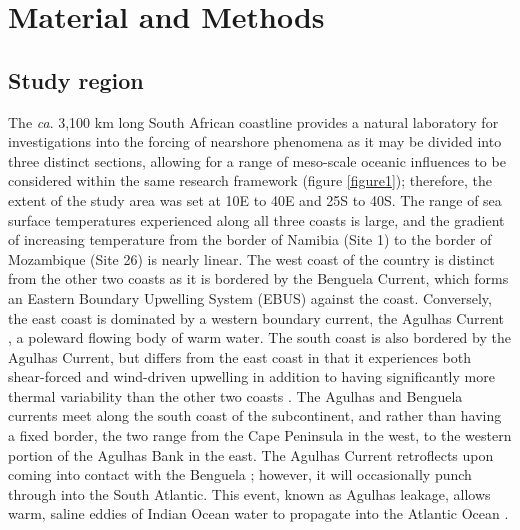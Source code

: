 \documentclass[utf8]{frontiersSCNS}
\begin{document}
\section{Material and Methods}
\subsection{Study region}
The \emph{ca}. 3,100 km long South African coastline provides a natural laboratory for investigations into the forcing of nearshore phenomena as it may be divided into three distinct sections, allowing for a range of meso-scale oceanic influences to be considered within the same research framework (figure \ref{figure1}); therefore, the extent of the study area was set at 10\degree E to 40\degree E and 25\degree S to 40\degree S. The range of sea surface temperatures experienced along all three coasts is large, and the gradient of increasing temperature from the border of Namibia (Site 1) to the border of Mozambique (Site 26) is nearly linear. The west coast of the country is distinct from the other two coasts as it is bordered by the Benguela Current, which forms an Eastern Boundary Upwelling System (EBUS) \citep{Hutchings2009} against the coast. Conversely, the east coast is dominated by a western boundary current, the Agulhas Current \citep{Luning1990}, a poleward flowing body of warm water. The south coast is also bordered by the Agulhas Current, but differs from the east coast in that it experiences both shear-forced and wind-driven upwelling \citep{Lutjeharms2000a} in addition to having significantly more thermal variability than the other two coasts \citep{Schlegel2017}. The Agulhas and Benguela currents meet along the south coast of the subcontinent, and rather than having a fixed border, the two range from the Cape Peninsula in the west, to the western portion of the Agulhas Bank in the east. The Agulhas Current retroflects upon coming into contact with the Benguela \citep{Hutchings2009}; however, it will occasionally punch through into the South Atlantic. This event, known as Agulhas leakage, allows warm, saline eddies of Indian Ocean water to propagate into the Atlantic Ocean \citep{Beal2011}.
\end{document}
